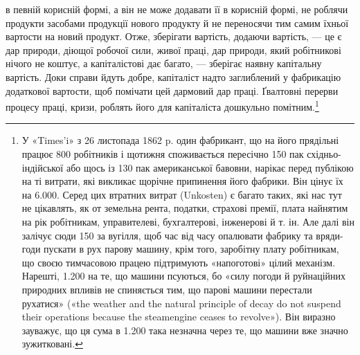 \parcont{}  %
в певній корисній формі, а він не може додавати її в корисній
формі, не роблячи продукти засобами продукції нового продукту
й не переносячи тим самим їхньої вартости на новий продукт.
Отже, зберігати вартість, додаючи вартість, — це є дар природи,
діющої робочої сили, живої праці, дар природи, який робітникові
нічого не коштує, а капіталістові дає багато, — зберігає наявну
капітальну вартість.  Доки справи йдуть добре, капіталіст
надто заглиблений у фабрикацію додаткової вартости, щоб помічати
цей дармовий дар праці. Ґвалтовні перерви процесу праці,
кризи, роблять його для капіталіста дошкульно помітним.\footnote{
У «Times’i» з 26 листопада 1862 p. один фабрикант, що на його
прядільні працює 800 робітників і щотижня споживається пересічно 150 пак
східньо-індійської або щось із 130 пак американської бавовни, нарікає
перед публікою на ті витрати, які викликає щорічне припинення його
фабрики. Він цінує їх на \num{6.000}. Серед цих втратних
витрат (Unkosten) є багато таких, які нас тут не цікавлять, як от земельна
рента, податки, страхові премії, плата найнятим на рік робітникам, управителеві,
бухгалтерові, інженерові й т. ін. Але далі він залічує сюди
150 за вугілля, щоб час від часу опалювати фабрику та
вряди-годи пускати в рух парову машину, крім того, заробітну плату
робітникам, що своєю тимчасовою працею підтримують «напоготові»
цілий механізм. Нарешті, \num{1.200} на те, що машини псуються,
бо «силу погоди й руйнаційних природних впливів не спиняється
тим, що парові машини перестали рухатися» («the weather and the natural
principle of decay do not suspend their operations because the steamengine
ceases to revolve»). Він виразно зауважує, що ця сума в \num{1.200} така незначна через те, що машини вже значно зужитковані.
}

